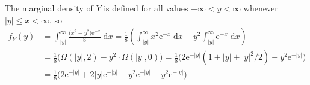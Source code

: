 \documentclass[10pt]{article}
\begin{document}
\begin{itemize}
    The marginal density of \(Y\) is defined for all values \(-\infty < y < \infty\) whenever \(|y| \le x < \infty\), so 
    \begin{align*}
        f_Y(y) &= \int_{|y|}^{\infty} \frac{\big( x^2 - y^2 \big) \mathrm{e}^{-x}}{8} \;\mathrm{d}x
        = \frac{1}{8} \left( \int_{|y|}^{\infty} x^2 \mathrm{e}^{-x} \;\mathrm{d}x - y^2 \int_{|y|}^{\infty} \mathrm{e}^{-x} \;\mathrm{d}x \right) \\
        &= \frac{1}{8} \Big( \Omega(|y|,2) - y^2 \cdot \Omega(|y|,0) \Big)
        = \frac{1}{8} \Big( 2\mathrm{e}^{-|y|}(1 + |y| + |y|^2/2) - y^2\mathrm{e}^{-|y|} \Big) \\
        &= \frac{1}{8} \Big( 2\mathrm{e}^{-|y|} + 2|y|\mathrm{e}^{-|y|} + y^2\mathrm{e}^{-|y|} - y^2\mathrm{e}^{-|y|} \Big)

\end{align*}
\end{itemize}
\end{document}
